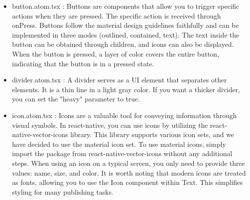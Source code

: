 \documentclass[conference, a4paper]{IEEEtran}
\begin{document}
\begin{enumerate}
    \begin{itemize}
        \item button.atom.tsx : Buttons are components that allow you to trigger specific actions when they are pressed. The specific action is received through onPress. Buttons follow the material design guidelines faithfully and can be implemented in three modes (outlined, contained, text). The text inside the button can be obtained through children, and icons can also be displayed. When the button is pressed, a layer of color covers the entire button, indicating that the button is in a pressed state.
        \item divider.atom.tsx : A divider serves as a UI element that separates other elements. It is a thin line in a light gray color. If you want a thicker divider, you can set the "heavy" parameter to true.
        \item icon.atom.tsx : Icons are a valuable tool for conveying information through visual symbols. In react-native, you can use icons by utilizing the react-native-vector-icons library. This library supports various icon sets, and we have decided to use the material icon set. To use material icons, simply import the package from react-native-vector-icons without any additional steps. When using an icon on a typical screen, you only need to provide three values: name, size, and color. It is worth noting that modern icons are treated as fonts, allowing you to use the Icon component within Text. This simplifies styling for many publishing tasks.
    \end{itemize}
\end{enumerate}
\end{document}
